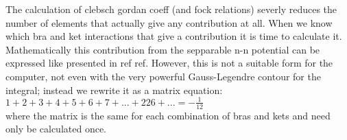 \documentclass[../main/report.tex]{subfiles}
\begin{document}
The calculation of clebsch gordan coeff (and fock relations) severly reduces the number of elements that actually give any contribution at all. 
When we know which bra and ket interactions that give a contribution it is time to calculate it. 
Mathematically this contribution from the sepparable n-n potential can be expressed like presented in ref ref.
However, this is not a suitable form for the computer, not even with the very powerful Gauss-Legendre contour for the integral; instead we rewrite it as a matrix equation:
$1+2+3+4+5+6+7+...+226+... = - \frac{1}{12}$\\
where the matrix is the same for each combination of bras and kets and need only be calculated once.

\end{document}
